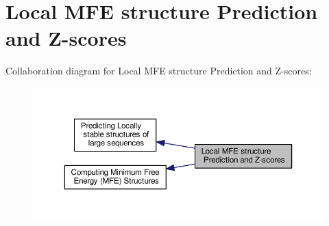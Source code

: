 \hypertarget{group__local__mfe__fold}{\section{Local M\-F\-E structure Prediction and Z-\/scores}
\label{group__local__mfe__fold}
}
Collaboration diagram for Local M\-F\-E structure Prediction and Z-\/scores\-:
\nopagebreak
\begin{figure}[H]
\begin{center}
\leavevmode
\includegraphics[width=350pt]{group__local__mfe__fold}
\end{center}
\end{figure}
